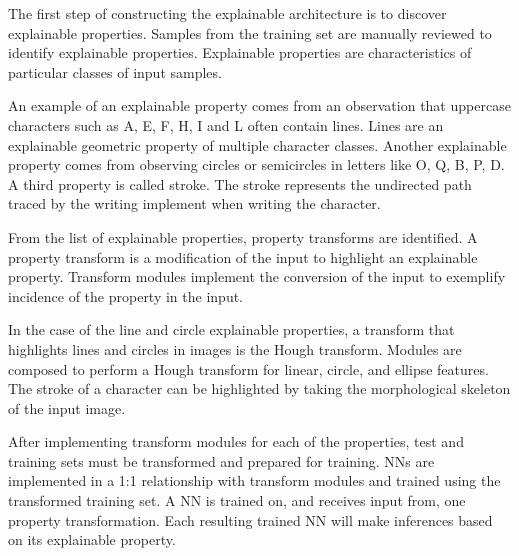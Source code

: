 \documentclass[conference]{IEEEtran}
\begin{document}

The first step of constructing the explainable architecture is to discover explainable properties.
Samples from the training set are manually reviewed to identify explainable
properties. Explainable properties are characteristics of particular classes of
input samples.

An example of an explainable property comes from an observation that uppercase
characters such as A, E, F, H, I and L often contain lines. Lines are an
explainable geometric property of multiple character classes. Another
explainable property comes from observing circles or semicircles in letters like
O, Q, B, P, D. A third property is called stroke.  The stroke represents the
undirected path traced by the writing implement when writing the character.


From the list of explainable properties, property transforms are identified.  A
property transform is a modification of the input to highlight an explainable
property.  Transform modules implement the conversion of the input to exemplify
incidence of the property in the input.

In the case of the line and circle explainable properties, a transform that
highlights lines and circles in images is the Hough
transform\cite{Hough1959qva}.  Modules are composed to perform a Hough
transform for linear, circle, and ellipse features.  The stroke of a character
can be highlighted by taking the morphological skeleton\cite{LEE1994} of the
input image.

After implementing transform modules for each of the properties, test and
training sets must be transformed and prepared for training. NNs are implemented
in a 1:1 relationship with transform modules and trained using the transformed
training set.  A NN is trained on, and receives input from, one property
transformation.  Each resulting trained NN will make inferences based on its
explainable property.
\end{document}

